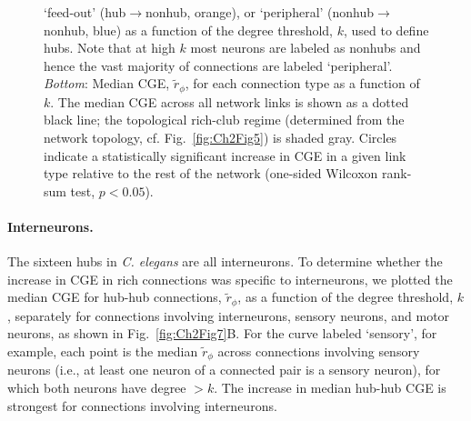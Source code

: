 \begin{figure}[!h]
{`feed-out' (hub$\rightarrow$nonhub, orange), or
`peripheral' (nonhub$\rightarrow$nonhub, blue) as a function of the degree threshold, $k$, used to define hubs.
Note that at high $k$ most neurons are labeled as nonhubs and hence the vast majority of connections are labeled `peripheral'.
 \emph{Bottom}: Median CGE, $\tilde{r}_\phi$, for each connection type as a function of $k$.
The median CGE across all network links is shown as a dotted black line; the topological rich-club regime (determined from the network topology, cf. Fig.~\ref{fig:Ch2Fig5}) is shaded gray.
Circles indicate a statistically significant increase in CGE in a given link type relative to the rest of the network (one-sided Wilcoxon rank-sum test, $p < 0.05$).
}
 \label{fig:Ch2Fig6}
\end{figure}

\paragraph{Interneurons.}
The sixteen hubs in \textit{C. elegans} are all interneurons.
To determine whether the increase in CGE in rich connections was specific to interneurons, we plotted the median CGE for hub-hub connections, $\tilde{r}_\phi$, as a function of the degree threshold, $k$, separately for connections involving interneurons, sensory neurons, and motor neurons, as shown in Fig.~\ref{fig:Ch2Fig7}B.
For the curve labeled `sensory', for example, each point is the median $\tilde{r}_\phi$ across connections involving sensory neurons (i.e., at least one neuron of a connected pair is a sensory neuron), for which both neurons have degree $>k$.
The increase in median hub-hub CGE is strongest for connections involving interneurons.
